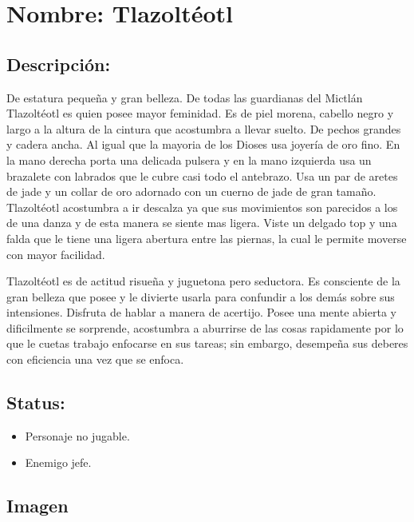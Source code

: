 \section{Nombre: Tlazoltéotl}  \label{per:tlazolteotl}
\subsection{Descripción: }  
De estatura pequeña y gran belleza. De todas las guardianas del Mictlán Tlazoltéotl es quien posee mayor feminidad. Es de piel morena, cabello negro y largo a la altura de la cintura que acostumbra a llevar suelto. De pechos grandes y cadera ancha. Al igual que la mayoria de los Dioses usa joyería de oro fino. En la mano derecha porta una delicada pulsera y en la mano izquierda usa un brazalete con labrados que le cubre casi todo el antebrazo. Usa un par de aretes de jade y un collar de oro adornado con un cuerno de jade de gran tamaño. Tlazoltéotl acostumbra a ir descalza ya que sus movimientos son parecidos a los de una danza y de esta manera se siente mas ligera. Viste un delgado top y una falda que le tiene una ligera abertura entre las piernas, la cual le permite moverse con mayor facilidad.
\\
\par
Tlazoltéotl es de actitud risueña y juguetona pero seductora. Es consciente de la gran belleza que posee y le divierte usarla para confundir a los demás sobre sus intensiones. Disfruta de hablar a manera de acertijo. Posee una mente abierta y dificilmente se sorprende, acostumbra a aburrirse de las cosas rapidamente por lo que le cuetas trabajo enfocarse en sus tareas; sin embargo, desempeña sus deberes con eficiencia una vez que se enfoca.    
\subsection{Status:}
	\begin{itemize}
		\item Personaje no jugable.
		\item Enemigo jefe.
	\end{itemize}
\subsection{Imagen}
